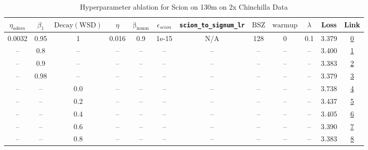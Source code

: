 \begin{table}[H]
\centering
\caption{Hyperparameter ablation for Scion on 130m on 2x Chinchilla Data}
\label{tab:ablation_scion_130m_2}
\begin{tabular}{cccccccccccc}
\toprule
$\eta_{adam}$ & $\beta_1$ & $\mathrm{Decay (WSD)}$ & $\eta$ & $\mathrm{\beta_{muon}}$ & $\epsilon_{scion}$ & \texttt{scion\_to\_signum\_lr} & $\mathrm{BSZ}$ & $\mathrm{warmup}$ & $\lambda$ & Loss & Link \\
\midrule
0.0032 & 0.95 & 1 & 0.016 & 0.9 & 1e-15 & N/A & 128 & 0 & 0.1 & 3.379 & \href{https://wandb.ai/stanford-mercury/optimizer-scaling/runs/sweep-130m-5B-sciona647e8lr0.016-wd0.1-minlr0-warmup0-b10.95-gn1-9e502b}{0} \\
\midrule
-- & 0.8 & -- & -- & -- & -- & -- & -- & -- & -- & 3.400 & \href{https://wandb.ai/stanford-mercury/optimizer-scaling/runs/sweep-130m-5B-scionb7ae93lr0.016-wd0.1-minlr0-warmup0-b10.8-gn1--6ad4dc}{1} \\
-- & 0.9 & -- & -- & -- & -- & -- & -- & -- & -- & 3.383 & \href{https://wandb.ai/stanford-mercury/optimizer-scaling/runs/sweep-130m-5B-scion6cb7fflr0.016-wd0.1-minlr0-warmup0-b10.9-gn1--4a658c}{2} \\
-- & 0.98 & -- & -- & -- & -- & -- & -- & -- & -- & 3.379 & \href{https://wandb.ai/stanford-mercury/optimizer-scaling/runs/sweep-130m-5B-scion277086lr0.016-wd0.1-minlr0-warmup0-b10.98-gn1-5c8c93}{3} \\
-- & -- & 0.0 & -- & -- & -- & -- & -- & -- & -- & 3.738 & \href{https://wandb.ai/stanford-mercury/optimizer-scaling/runs/sweep-130m-5B-scion8f987elr0.016-wd0.1-minlr0-warmup0-b10.95-gn1-0549f7}{4} \\
-- & -- & 0.2 & -- & -- & -- & -- & -- & -- & -- & 3.437 & \href{https://wandb.ai/stanford-mercury/optimizer-scaling/runs/sweep-130m-5B-scionf8ad83lr0.016-wd0.1-minlr0-warmup0-b10.95-gn1-90f661}{5} \\
-- & -- & 0.4 & -- & -- & -- & -- & -- & -- & -- & 3.405 & \href{https://wandb.ai/stanford-mercury/optimizer-scaling/runs/sweep-130m-5B-scioncc0a59lr0.016-wd0.1-minlr0-warmup0-b10.95-gn1-8a6246}{6} \\
-- & -- & 0.6 & -- & -- & -- & -- & -- & -- & -- & 3.390 & \href{https://wandb.ai/stanford-mercury/optimizer-scaling/runs/sweep-130m-5B-scion621619lr0.016-wd0.1-minlr0-warmup0-b10.95-gn1-ef5db1}{7} \\
-- & -- & 0.8 & -- & -- & -- & -- & -- & -- & -- & 3.383 & \href{https://wandb.ai/stanford-mercury/optimizer-scaling/runs/sweep-130m-5B-sciona94de7lr0.016-wd0.1-minlr0-warmup0-b10.95-gn1-cd15b5}{8} \\

\end{tabular}
\end{table}
